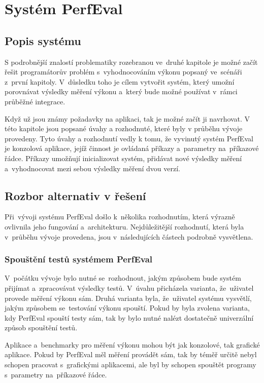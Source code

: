 \chapter{Systém PerfEval}

\section{Popis systému}

S podrobnější znalostí problematiky rozebranou ve~druhé kapitole je možné začít řešit programátorův
problém s~vyhodnocováním výkonu popsaný ve~scénáři z~první kapitoly.
V~důsledku toho je cílem vytvořit systém, který umožní porovnávat výsledky
měření výkonu a~který bude možné používat v~rámci průběžné integrace.

Když už jsou známy požadavky na aplikaci, tak je možné začít ji navrhovat.
V této kapitole jsou popsané úvahy a rozhodnuté, které byly v průběhu vývoje
provedeny. Tyto úvahy a rozhodnutí vedly k tomu, že vyvinutý systém PerfEval je konzolová aplikace,
jejíž činnost je ovládaná příkazy a~parametry na~příkazové řádce.
Příkazy umožňují inicializovat systém, přidávat nové výsledky měření a~vyhodnocovat mezi sebou výsledky
měření dvou verzí.

\section{Rozbor alternativ v řešení}
Při~vývoji systému PerfEval došlo k~několika rozhodnutím, která výrazně ovlivnila jeho fungování a~architekturu.
Nejdůležitější rozhodnutí, která byla v~průběhu vývoje provedena, jsou v~následujících částech podrobně vysvětlena.

\subsection{Spouštění testů systémem PerfEval}
V~počátku vývoje bylo nutné se~rozhodnout, jakým způsobem bude systém přijímat a~zpracovávat výsledky testů.
V~úvahu přicházela varianta, že~uživatel provede měření výkonu sám. Druhá varianta byla, že~uživatel systému
vysvětlí, jakým způsobem se~testování výkonu spouští. Pokud by byla zvolena varianta, kdy PerfEval spouští testy
sám, tak by bylo nutné nalézt dostatečně univerzální způsob spouštění testů.

Aplikace a~benchmarky pro měření výkonu mohou být jak konzolové, tak grafické aplikace. Pokud by PerfEval měl
měření provádět sám, tak by téměř určitě nebyl schopen pracovat s~grafickými aplikacemi, ale byl by schopen
spouštět programy s~parametry na~příkazové řádce.

